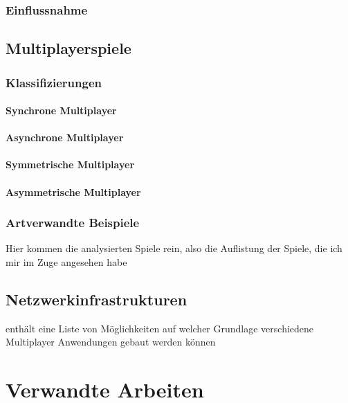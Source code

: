 \subsection{Einflussnahme}
\cite{emmerich_impact_2017}


\section{Multiplayerspiele}

\subsection{Klassifizierungen}

\subsubsection{Synchrone Multiplayer}

\subsubsection{Asynchrone Multiplayer}

\subsubsection{Symmetrische Multiplayer}

\subsubsection{Asymmetrische Multiplayer}

\subsection{Artverwandte Beispiele}
Hier kommen die analysierten Spiele rein, also die Auflistung der Spiele, die ich mir im Zuge angesehen habe

\section{Netzwerkinfrastrukturen}

enthält eine Liste von Möglichkeiten auf welcher Grundlage verschiedene Multiplayer Anwendungen gebaut werden können


\chapter{Verwandte Arbeiten}

